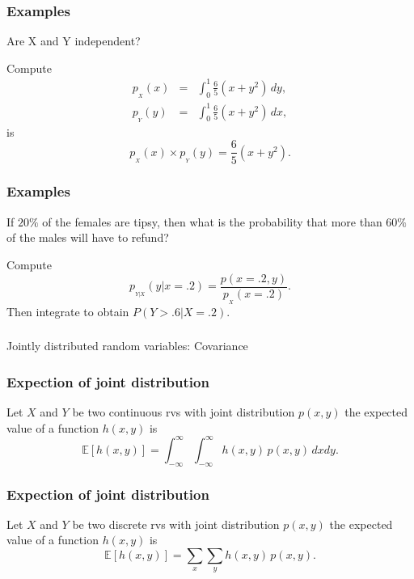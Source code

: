 \begin{frame}[fragile]\frametitle{Examples}
Are X and Y independent?  

\vspace{.1in}

Compute
\begin{eqnarray*}
p_{_X}(x)& =& \int_0^1 \frac{6}{5}(x+y^2)\, dy, \\ 
p_{_Y}(y)& =& \int_0^1 \frac{6}{5}(x+y^2)\, dx, 
\end{eqnarray*}
is
$$p_{_X}(x) \times p_{_Y}(y) = \frac{6}{5}(x+y^2).$$

\end{frame}


\begin{frame}[fragile]\frametitle{Examples}

If $20\%$ of the females are tipsy, then what 
is the probability that more than $60\%$ of the males will have to refund? 


\vspace{.1in}

Compute
$$p_{_{Y|X}}(y|x=.2)  = \frac{p(x=.2,y)}{p_{_X}(x=.2)}.$$
Then integrate to obtain $P(Y>.6|X=.2)$.

\end{frame}

\begin{frame}[fragile]\frametitle{}
\begin{center}
{\Large Jointly distributed random variables: Covariance}

\end{center}
\end{frame}



\begin{frame}[fragile]\frametitle{Expection of joint distribution}

\begin{defn}
Let $X$ and $Y$ be two continuous rvs with joint distribution
$p(x,y)$ the expected value of a function $h(x,y)$ is
$$\mathbb E[h(x,y)] = \int_{-\infty}^{\infty}  \int_{-\infty}^{\infty} 
h(x,y) \, p(x,y)  \, dx dy.$$
\end{defn}

\end{frame}

\begin{frame}[fragile]\frametitle{Expection of joint distribution}

\begin{defn}
Let $X$ and $Y$ be two discrete rvs with joint distribution
$p(x,y)$ the expected value of a function $h(x,y)$ is
$$\mathbb E[h(x,y)] = \sum_x \sum_y h(x,y) \, p(x,y).$$
\end{defn}

\end{frame}



